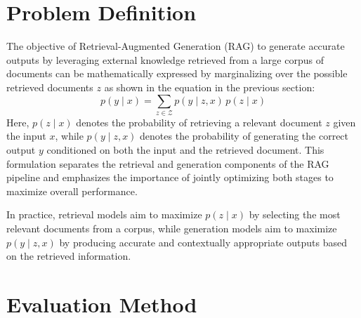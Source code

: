 \documentclass[twocolumn, 10pt]{article}
\begin{document}
\section{Problem Definition}

The objective of Retrieval-Augmented Generation (RAG) to generate accurate outputs by leveraging external knowledge retrieved from a large corpus of documents can be mathematically expressed by marginalizing over the possible retrieved documents \( z \) as shown in the equation in the previous section:
\begin{equation*}
p(y \mid x) = \sum_{z \in \mathcal{Z}} p(y \mid z, x) \, p(z \mid x)
\end{equation*}
Here, \( p(z \mid x) \) denotes the probability of retrieving a relevant document \( z \) given the input \( x \), while \( p(y \mid z, x) \) denotes the probability of generating the correct output \( y \) conditioned on both the input and the retrieved document. This formulation separates the retrieval and generation components of the RAG pipeline and emphasizes the importance of jointly optimizing both stages to maximize overall performance.

In practice, retrieval models aim to maximize \( p(z \mid x) \) by selecting the most relevant documents from a corpus, while generation models aim to maximize \( p(y \mid z, x) \) by producing accurate and contextually appropriate outputs based on the retrieved information.

\section{Evaluation Method}
\end{document}
